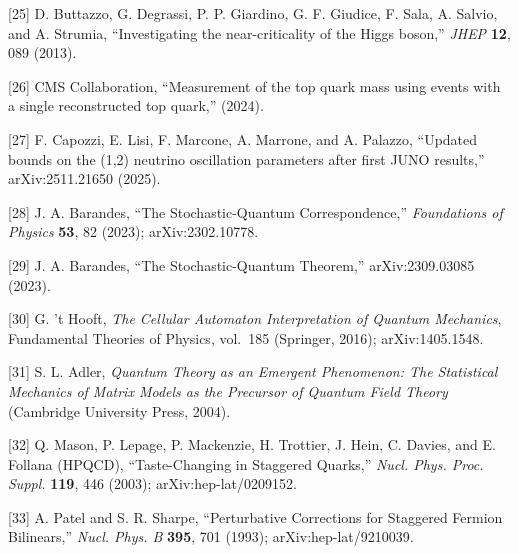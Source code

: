 \documentclass[
]{article}
\begin{document}
{[}25{]} D. Buttazzo, G. Degrassi, P. P. Giardino, G. F. Giudice, F.
Sala, A. Salvio, and A. Strumia, ``Investigating the near-criticality of
the Higgs boson,'' \emph{JHEP} \textbf{12}, 089 (2013).

{[}26{]} CMS Collaboration, ``Measurement of the top quark mass using
events with a single reconstructed top quark,'' (2024).

{[}27{]} F. Capozzi, E. Lisi, F. Marcone, A. Marrone, and A. Palazzo,
``Updated bounds on the (1,2) neutrino oscillation parameters after
first JUNO results,'' arXiv:2511.21650 (2025).

{[}28{]} J. A. Barandes, ``The Stochastic-Quantum Correspondence,''
\emph{Foundations of Physics} \textbf{53}, 82 (2023); arXiv:2302.10778.

{[}29{]} J. A. Barandes, ``The Stochastic-Quantum Theorem,''
arXiv:2309.03085 (2023).

{[}30{]} G. 't Hooft, \emph{The Cellular Automaton Interpretation of
Quantum Mechanics}, Fundamental Theories of Physics, vol.~185 (Springer,
2016); arXiv:1405.1548.

{[}31{]} S. L. Adler, \emph{Quantum Theory as an Emergent Phenomenon:
The Statistical Mechanics of Matrix Models as the Precursor of Quantum
Field Theory} (Cambridge University Press, 2004).

{[}32{]} Q. Mason, P. Lepage, P. Mackenzie, H. Trottier, J. Hein, C.
Davies, and E. Follana (HPQCD), ``Taste-Changing in Staggered Quarks,''
\emph{Nucl. Phys. Proc. Suppl.} \textbf{119}, 446 (2003);
arXiv:hep-lat/0209152.

{[}33{]} A. Patel and S. R. Sharpe, ``Perturbative Corrections for
Staggered Fermion Bilinears,'' \emph{Nucl. Phys. B} \textbf{395}, 701
(1993); arXiv:hep-lat/9210039.
\end{document}
